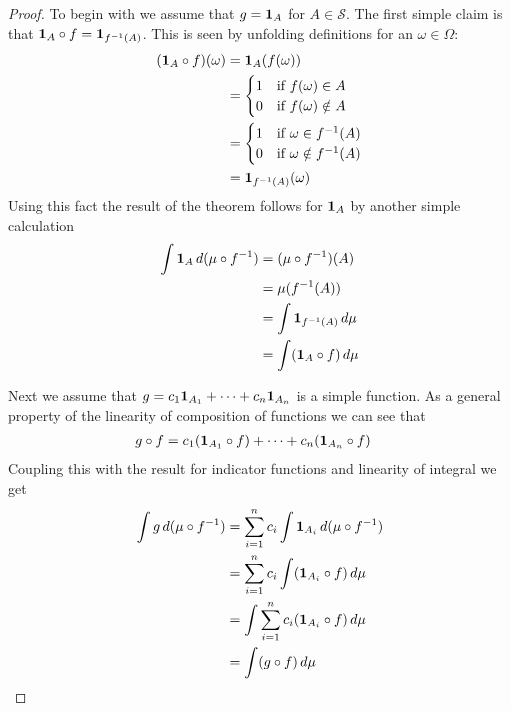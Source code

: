 \begin{proof}
To begin with we assume that $g = \textbf{1}_{A}$ for $A \in
\mathcal{S}$.  The first simple claim is that $\textbf{1}_{A}
\circ f = \textbf{1}_{f^{-1}(A)}$.  This is seen by unfolding
definitions for an $\omega \in \Omega$:
\begin{align*}
(\textbf{1}_{A} \circ f)(\omega) &= \textbf{1}_{A} (f(\omega)) \\
&= \begin{cases}
1 &\text{if $f(\omega) \in A$}\\
0 &\text{if $f(\omega) \notin A$}
\end{cases}\\
&= \begin{cases}
1 &\text{if $\omega \in f^{-1}(A)$}\\
0 &\text{if $\omega \notin f^{-1}(A)$}
\end{cases}\\
&= \textbf{1}_{f^{-1}(A)}(\omega)
\end{align*}
Using this fact the result of the theorem follows for
$\textbf{1}_{A}$ by another simple calculation
\begin{align*}
\int \textbf{1}_{A} \, d (\mu \circ f^{-1}) &= (\mu \circ f^{-1})(A)
\\
&= \mu(f^{-1}(A)) \\
&= \int \textbf{1}_{f^{-1}(A)} \, d\mu \\
&= \int (\textbf{1}_{A} \circ f) \, d\mu
\end{align*}

Next we assume that $g = c_1 \textbf{1}_{A_1} + \cdots + c_n
\textbf{1}_{A_n}$ is a simple function. As a general property of
the linearity of composition of functions we can see that 
\begin{align*}
g \circ f
&= c_1 (\textbf{1}_{A_1} \circ f) + \cdots + c_n (\textbf{1}_{A_n} \circ f)
\end{align*}
Coupling this with the result for indicator functions and linearity of
integral we get
\begin{align*}
\int g \, d (\mu \circ f^{-1}) &= \sum_{i=1}^n c_i \int \textbf{1}_{A_i} \, d (\mu \circ f^{-1})
\\
&= \sum_{i=1}^n c_i \int (\textbf{1}_{A_i} \circ f) \, d \mu \\
&=  \int \sum_{i=1}^n c_i (\textbf{1}_{A_i} \circ f) \, d \mu \\
&= \int (g \circ f) \, d\mu
\end{align*}


\end{proof}
